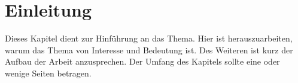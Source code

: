 \chapter{Einleitung}
\label{kap:einleitung}

Dieses Kapitel dient zur Hinführung an das Thema. Hier ist herauszuarbeiten, warum das
Thema von Interesse und Bedeutung ist. Des Weiteren ist kurz der Aufbau der Arbeit
anzusprechen. Der Umfang des Kapitels sollte eine oder wenige Seiten betragen.